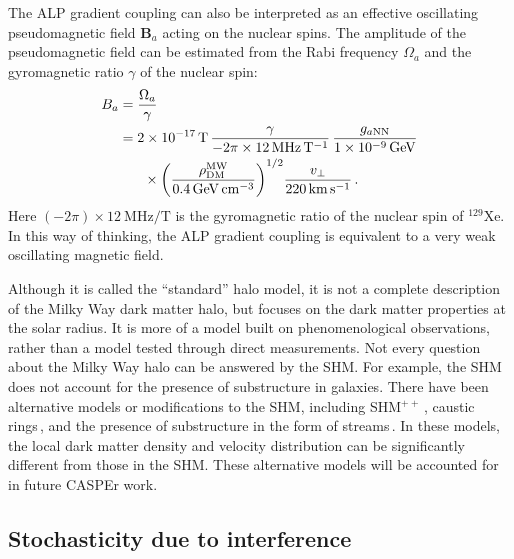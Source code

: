 The ALP gradient coupling can also be interpreted as an effective oscillating
pseudomagnetic field $\boldsymbol{B}_a$ acting on the nuclear spins.
The amplitude of the pseudomagnetic field can be estimated from the Rabi frequency $\Omega_a$ and the gyromagnetic ratio $\gamma$ of the nuclear spin:
\begin{align}
B_a
  &= \frac{\Omega_a}{\gamma} \\
  &= \SI{2e-17}{\tesla}\,
     \frac{\gamma}
          {-2\pi \times \SI{12}{\mega\hertz\per\tesla}}\,
     \frac{g_{a\mathrm{NN}}}
          {\SI{1e-9}{\giga\electronvolt}}
     \notag \\
  &\phantom{=}\quad{}\times
     \left(
       \frac{\rho_\mathrm{DM}^\mathrm{MW}}
            {\SI{0.4}{\giga\electronvolt\per\centi\meter\cubed}}
     \right)^{1/2}
     \frac{v_\perp}
          {\SI{220}{\kilo\meter\per\second}}
\,.\label{eq:Bpseudo}
\end{align}
Here $(-2 \pi) \times \SI{12}{\MHz\per\tesla}$ is the gyromagnetic ratio of the nuclear spin of $^{129}$Xe.
In this way of thinking, the ALP gradient coupling is equivalent to a very weak oscillating magnetic field.

Although it is called the ``standard'' halo model, it is not a complete description of the Milky Way dark matter halo, but focuses on the dark matter properties at the solar radius.
It is more of a model built on phenomenological observations, rather than a model tested through direct measurements.
Not every question about the Milky Way halo can be answered by the SHM.
For example, the SHM does not account for the presence of substructure in galaxies.
There have been alternative models or modifications to the SHM, including SHM$^{++}$\,\cite{Evans2019_SHMRefined}, caustic rings\,\cite{Sikivie1998_CausticRings}, and the presence of substructure in the form of streams\,\cite{OHare2026_Finegrained}.
In these models, the local dark matter density and velocity distribution can be significantly different from those in the SHM.
These alternative models will be accounted for in future CASPEr work.

\subsection{Stochasticity due to interference}\label{sec:theory:MWALP:stochasticity}

